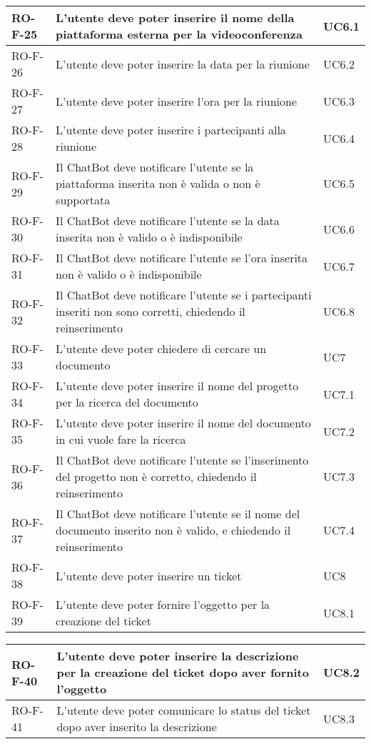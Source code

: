 \begin{center}
\begin{tabular}{ | m{8em} | m{18em} | m{12em} | }
\hline
RO-F-25&L’utente deve poter inserire il nome della piattaforma esterna per la videoconferenza &UC6.1 \\
\hline
RO-F-26&L’utente deve poter inserire la data per la riunione &UC6.2 \\
\hline
RO-F-27&L’utente deve poter inserire l’ora per la riunione &UC6.3 \\
\hline
RO-F-28&L’utente deve poter inserire i partecipanti alla riunione &UC6.4 \\
\hline
RO-F-29&Il ChatBot deve notificare l’utente se la piattaforma inserita non è valida o non è supportata &UC6.5 \\
\hline
RO-F-30&Il ChatBot deve notificare l’utente se la data inserita non è valido o è indisponibile &UC6.6 \\
\hline
RO-F-31&Il ChatBot deve notificare l’utente se l’ora inserita non è valido o è indisponibile &UC6.7 \\
\hline
RO-F-32&Il ChatBot deve notificare l’utente se i partecipanti inseriti non sono corretti, chiedendo il reinserimento &UC6.8 \\
\hline
RO-F-33&L’utente deve poter chiedere di cercare un documento &UC7 \\
\hline
RO-F-34&L’utente deve poter inserire il nome del progetto per la ricerca del documento &UC7.1 \\
\hline
RO-F-35&L’utente deve poter inserire il nome del documento in cui vuole fare la ricerca &UC7.2 \\
\hline
RO-F-36&Il ChatBot deve notificare l’utente se l’inserimento del progetto non è corretto, chiedendo il reinserimento &UC7.3\\
\hline
RO-F-37&Il ChatBot deve notificare l’utente se il nome del documento inserito non è valido, e chiedendo il reinserimento &UC7.4 \\
\hline
RO-F-38&L’utente deve poter inserire un ticket &UC8 \\
\hline
RO-F-39&L’utente deve poter fornire l’oggetto per la creazione del ticket &UC8.1 \\
\hline
\end{tabular}
\newpage
\begin{tabular}{ | m{8em} | m{18em} | m{12em} | }
\hline
RO-F-40&L’utente deve poter inserire la descrizione per la creazione del ticket dopo aver fornito l’oggetto &UC8.2 \\
\hline
RO-F-41&L’utente deve poter comunicare lo status del ticket dopo aver inserito la descrizione &UC8.3 \\

\end{tabular}
\end{center}

